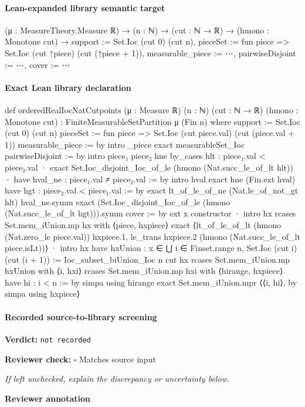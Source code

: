 \documentclass[10pt]{article}
\newcommand{\reviewerbox}{%
  \par\noindent\fbox{\parbox{0.96\linewidth}{\rule{0pt}{0.38in}}}\par
}
\newcommand{\reviewmatch}[1]{%
  \par\noindent\textbf{Reviewer check:} $\square$\; #1\par
  \noindent\emph{If left unchecked, explain the discrepancy or uncertainty below.}\par
}
\begin{document}
\paragraph{Lean-expanded library semantic target}
\begin{ReviewVerbatim}
(μ : MeasureTheory.Measure ℝ) →
  (n : ℕ) →
    (cut : ℕ → ℝ) →
      (hmono : Monotone cut) →
        { support := Set.Ioc (cut 0) (cut n), pieceSet := fun piece => Set.Ioc (cut ↑piece) (cut (↑piece + 1)),
          measurable_piece := ⋯, pairwiseDisjoint := ⋯, cover := ⋯ }
\end{ReviewVerbatim}

\paragraph{Exact Lean library declaration}
\begin{ReviewVerbatim}
def orderedRealIocNatCutpoints
    (μ : Measure ℝ) (n : ℕ) (cut : ℕ → ℝ) (hmono : Monotone cut) :
    FiniteMeasurableSetPartition μ (Fin n) where
  support := Set.Ioc (cut 0) (cut n)
  pieceSet := fun piece => Set.Ioc (cut piece.val) (cut (piece.val + 1))
  measurable_piece := by
    intro _piece
    exact measurableSet_Ioc
  pairwiseDisjoint := by
    intro piece₁ piece₂ hne
    by_cases hlt : piece₁.val < piece₂.val
    · exact Set.Ioc_disjoint_Ioc_of_le
        (hmono (Nat.succ_le_of_lt hlt))
    · have hval_ne : piece₁.val ≠ piece₂.val := by
        intro hval
        exact hne (Fin.ext hval)
      have hgt : piece₂.val < piece₁.val := by
        exact lt_of_le_of_ne (Nat.le_of_not_gt hlt) hval_ne.symm
      exact (Set.Ioc_disjoint_Ioc_of_le
        (hmono (Nat.succ_le_of_lt hgt))).symm
  cover := by
    ext x
    constructor
    · intro hx
      rcases Set.mem_iUnion.mp hx with ⟨piece, hxpiece⟩
      exact
        ⟨lt_of_le_of_lt (hmono (Nat.zero_le piece.val)) hxpiece.1,
          le_trans hxpiece.2 (hmono (Nat.succ_le_of_lt piece.isLt))⟩
    · intro hx
      have hxUnion :
          x ∈ ⋃ i ∈ Finset.range n,
            Set.Ioc (cut i) (cut (i + 1)) :=
        Ioc_subset_biUnion_Ioc n cut hx
      rcases Set.mem_iUnion.mp hxUnion with ⟨i, hxi⟩
      rcases Set.mem_iUnion.mp hxi with ⟨hirange, hxpiece⟩
      have hi : i < n := by
        simpa using hirange
      exact Set.mem_iUnion.mpr ⟨⟨i, hi⟩, by simpa using hxpiece⟩
\end{ReviewVerbatim}

\paragraph{Recorded source-to-library screening}
\textbf{Verdict:} \texttt{not recorded}
\reviewmatch{Matches source input}
\noindent\textbf{Reviewer annotation}\par
\reviewerbox
\clearpage
\hypertarget{library-prerequisite-aab7fae9d893ec88}{}
\end{document}
